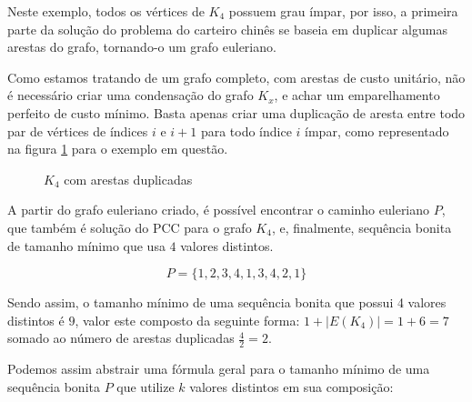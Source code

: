         Neste exemplo, todos os vértices de $K_4$ possuem grau ímpar, por isso, a primeira parte da solução do problema do carteiro chinês se baseia em duplicar algumas arestas do grafo, tornando-o um grafo euleriano.

        Como estamos tratando de um grafo completo, com arestas de custo unitário, não é necessário criar uma condensação do grafo $K_x$, e achar um emparelhamento perfeito de custo mínimo.
        Basta apenas criar uma duplicação de aresta entre todo par de vértices de índices $i$ e $i+1$ para todo índice $i$ ímpar, como representado na figura \ref{k4+} para o exemplo em questão.

        \begin{figure}[H]
            \centering
            \caption{$K_4$ com arestas duplicadas}
            \label{k4+}
        \end{figure}

        A partir do grafo euleriano criado, é possível encontrar o caminho euleriano $P$, que também é solução do PCC para o grafo $K_4$, e, finalmente, sequência bonita de tamanho mínimo que usa $4$ valores distintos.

        \[ P = \{1, 2, 3, 4, 1, 3, 4, 2, 1\} \]

        Sendo assim, o tamanho mínimo de uma sequência bonita que possui 4 valores distintos é $9$, valor este composto da seguinte forma: $1 + |E(K_4)| = 1 + 6 = 7$ somado ao número de arestas duplicadas $\frac{4}{2} = 2$.


        Podemos assim abstrair uma fórmula geral para o tamanho mínimo de uma sequência bonita $P$ que utilize $k$ valores distintos em sua composição:

